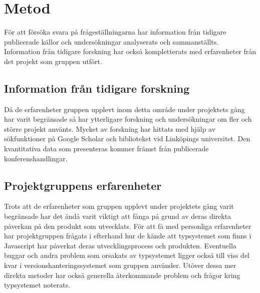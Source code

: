 \section{Metod}
\label{sec:alexander-method}

För att försöka svara på frågeställningarna har information från tidigare publicerade källor och undersökningar analyserats och sammanställts. Information från tidigare forskning har också kompletterats med erfarenheter från det projekt som gruppen utfört. 

\subsection{Information från tidigare forskning}

Då de erfarenheter gruppen upplevt inom detta område under projektets gång har varit begränsade så har ytterligare forskning och undersökningar om fler och större projekt använts. Mycket av forskning har hittats med hjälp av sökfunktioner på Google Scholar och biblioteket vid Linköpings universitet. Den kvantitativa data som presenteras kommer främst från publicerade konferenshandlingar.

\subsection{Projektgruppens erfarenheter}
Trots att de erfarenheter som gruppen upplevt under projektets gång varit begränsade har det ändå varit viktigt att fånga på grund av deras direkta påverkan på den produkt som utvecklats. För att få med personliga erfarenheter har projektgruppen frågats i efterhand hur de kände att typsystemet som finns i Javascript har påverkat deras utvecklingsprocess och produkten. Eventuella buggar och andra problem som orsakats av typsystemet ligger också till viss del kvar i versionshanteringssystemet som gruppen använder. Utöver dessa mer direkta metoder har också generella återkommande problem och frågor kring typsystemet noterats.
